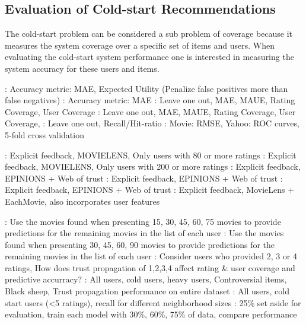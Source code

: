 \subsection{Evaluation of Cold-start Recommendations}

The cold-start problem can be considered a sub problem of coverage because it measures the system coverage over a specific set of items and users. When evaluating the cold-start system performance one is interested in measuring the system accuracy for these users and items.


\cite{Rashid2008}: Accuracy metric: MAE, Expected Utility (Penalize false positives more than false negatives)
\cite{Rashid2002}: Accuracy metric: MAE
\cite{Massa2004}: Leave one out, MAE, MAUE, Rating Coverage, User Coverage
\cite{Massa2007}: Leave one out, MAE, MAUE, Rating Coverage, User Coverage,
\cite{Jamali2009}: Leave one out, Recall/Hit-ratio
\cite{Agarwal2009}: Movie: RMSE, Yahoo: ROC curves, 5-fold cross validation


\cite{Rashid2008}: Explicit feedback, MOVIELENS, Only users with 80 or more ratings
\cite{Rashid2002}: Explicit feedback, MOVIELENS, Only users with 200 or more ratings
\cite{Massa2004}: Explicit feedback, EPINIONS + Web of trust
\cite{Massa2007}: Explicit feedback, EPINIONS + Web of trust
\cite{Jamali2009}: Explicit feedback, EPINIONS + Web of trust
\cite{Agarwal2009}: Explicit feedback, MovieLens + EachMovie, also incorporates user features



\cite{Rashid2008}: Use the movies found when presenting 15, 30, 45, 60, 75 movies to provide predictions for the remaining movies in the list of each user
\cite{Rashid2002}: Use the movies found when presenting 30, 45, 60, 90 movies to provide predictions for the remaining movies in the list of each user
\cite{Massa2004}: Consider users who provided 2, 3 or 4 ratings, How does trust propagation of 1,2,3,4 affect rating \& user coverage and predictive accurracy?
\cite{Massa2007}: All users, cold users, heavy users, Controversial items, Black sheep, Trust propagation performance on entire dataset
\cite{Jamali2009}: All users, cold start users (<5 ratings), recall for different neighborhood sizes
\cite{Agarwal2009}: 25\% set aside for evaluation, train each model with 30\%, 60\%, 75\% of data, compare performance


